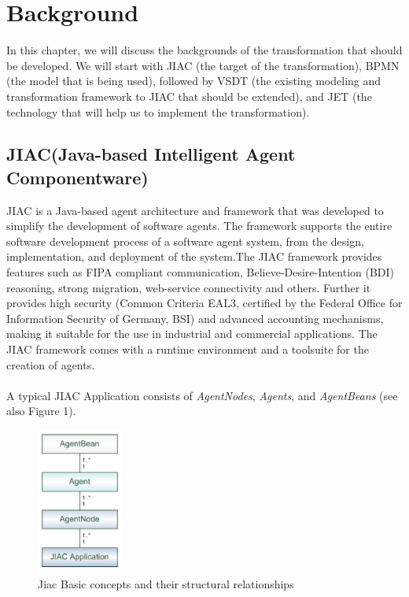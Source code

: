 \section{Background}
\label{sec:Background}
In this chapter, we will discuss the backgrounds of the transformation that should be developed. We will start with JIAC (the target of the transformation), BPMN (the model that is being used), followed by VSDT (the existing modeling and transformation framework to JIAC that should be extended), and JET (the technology that will help us to implement the transformation).
\subsection{JIAC(Java-based Intelligent Agent Componentware)}
JIAC \cite{11,15,4,1} is a Java-based agent architecture and framework that was developed to simplify the development of software agents. The framework supports the entire software development process of a software agent system, from the design, implementation, and deployment of the system.The JIAC framework provides features such as FIPA compliant communication,
Believe-Desire-Intention (BDI) reasoning, strong migration, web-service
connectivity and others. Further it provides high security (Common Criteria EAL3,
certified by the Federal Office for Information Security of Germany, BSI) and advanced
accounting mechanisms, making it suitable for the use in industrial and
commercial applications. The JIAC framework comes with a runtime environment
and a toolsuite for the creation of agents. \\\\ A typical JIAC Application consists of \textit{AgentNodes}, \textit{Agents}, and \textit{AgentBeans} (see also Figure 1).
\begin{figure}[h]
	\centering
		\includegraphics[width=0.25\textwidth]{images/jiac_basic.png}
		\caption{Jiac Basic concepts and their structural relationships \cite{11}}
	\label{fig:jiac_basic}
\end{figure}
